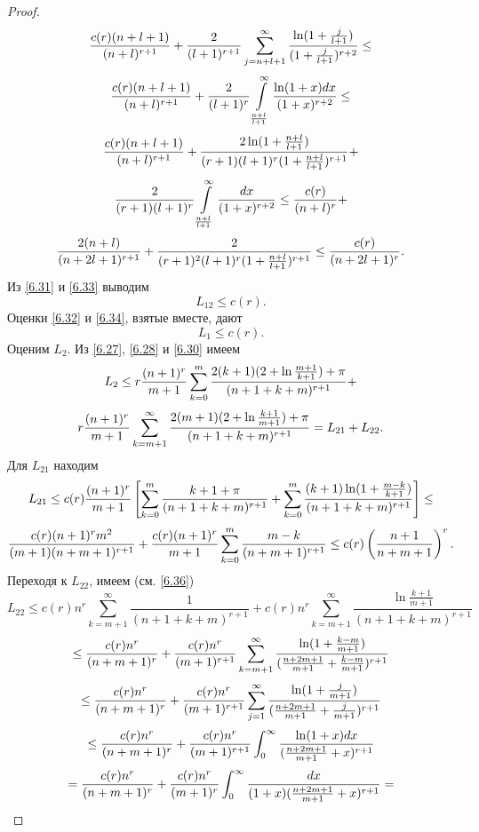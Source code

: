 \begin{proof}
$$$$
$$
{c(r)(n+l+1)\over(n+l)^{r+1}}+\frac{2}{(l+1)^{r+1}}\sum\limits_{j=n+l+1}^\infty\frac{\ln(1+\frac{j}{l+1})}{(1+{j\over l+1})^{r+2}}\le
$$
$$
{c(r)(n+l+1)\over(n+l)^{r+1}}+\frac{2}{(l+1)^{r}}\int\limits_\frac{n+l}{l+1}^\infty {\ln(1+x)dx\over(1+x)^{r+2}}\le
$$
$$
{c(r)(n+l+1)\over(n+l)^{r+1}}+\frac{2\ln(1+{n+l\over l+1})}{(r+1)(l+1)^{r}(1+{n+l\over l+1})^{r+1}}+
$$
$$
\frac{2}{(r+1)(l+1)^{r}}\int\limits_\frac{n+l}{l+1}^\infty {dx\over(1+x)^{r+2}}\le
{c(r)\over(n+l)^{r}}+
$$
\begin{equation}\label{6.33}
 \frac{2(n+l)}{(n+2l+1)^{r+1}}+\frac{2}{(r+1)^2(l+1)^{r}(1+{n+l\over l+1})^{r+1}}\le {c(r)\over(n+2l+1)^{r}}.
 \end{equation}
Из \eqref{6.31} и \eqref{6.33}  выводим
\begin{equation}\label{6.34}
    L_{12}\le c(r).
\end{equation}
Оценки \eqref{6.32} и \eqref{6.34}, взятые вместе, дают
\begin{equation}\label{6.35}
    L_1\le c(r).
\end{equation}
Оценим $L_2$. Из \eqref{6.27}, \eqref{6.28} и \eqref{6.30} имеем
$$
L_2\le r{(n+1)^{r}\over m+1}\sum\limits_{k=0}^m\frac{2(k+1)(2+\ln\frac{m+1}{k+1})+\pi}{(n+1+k+m)^{r+1}}+
 $$
\begin{equation}\label{6.36}
    r{(n+1)^{r}\over m+1}\sum_{k=m+1}^\infty\frac{2(m+1)(2+\ln\frac{k+1}{m+1})+\pi}{(n+1+k+m)^{r+1}}=L_{21}+L_{22}.
 \end{equation}
Для $L_{21}$ находим
$$
L_{21}\le c(r){(n+1)^{r}\over m+1}\left[\sum_{k=0}^m\frac{k+1+\pi}{(n+1+k+m)^{r+1}}+\sum_{k=0}^m\frac{(k+1)\ln(1+\frac{m-k}{k+1})}{(n+1+k+m)^{r+1}}\right]\le
$$
\begin{equation}\label{6.37}
    {c(r)(n+1)^{r}m^2\over (m+1)(n+m+1)^{r+1}}+{c(r)(n+1)^{r}\over m+1}\sum_{k=0}^m{m-k\over (n+m+1)^{r+1}}\le c(r)\left({n+1\over n+m+1}\right)^r.
\end{equation}
Переходя к  $L_{22}$, имеем (см. \eqref{6.36})
$$
L_{22}\le c(r)n^r\sum_{k=m+1}^\infty\frac{1}{(n+1+k+m)^{r+1}}+c(r)n^r\sum_{k=m+1}^\infty\frac{\ln\frac{k+1}{m+1}}{(n+1+k+m)^{r+1}}
$$
$$
\le {c(r)n^r\over(n+m+1)^{r}}+{c(r)n^r\over(m+1)^{r+1}}\sum_{k=m+1}^\infty{\ln(1+\frac{k-m}{m+1})\over(\frac{n+2m+1}{m+1}+\frac{k-m}{m+1})^{r+1}}
$$
$$
\le {c(r)n^r\over(n+m+1)^{r}}+{c(r)n^r\over(m+1)^{r+1}}\sum_{j=1}^\infty{\ln(1+\frac{j}{m+1})\over(\frac{n+2m+1}{m+1}+\frac{j}{m+1})^{r+1}}
$$
$$
\le {c(r)n^r\over(n+m+1)^{r}}+{c(r)n^r\over(m+1)^{r+1}}\int_{0}^\infty{\ln(1+x)dx\over(\frac{n+2m+1}{m+1}+x)^{r+1}}
$$
$$
={c(r)n^r\over(n+m+1)^{r}}+{c(r)n^r\over(m+1)^{r}}\int_{0}^\infty{dx\over(1+x)(\frac{n+2m+1}{m+1}+x)^{r+1}}=
$$
\end{proof}
